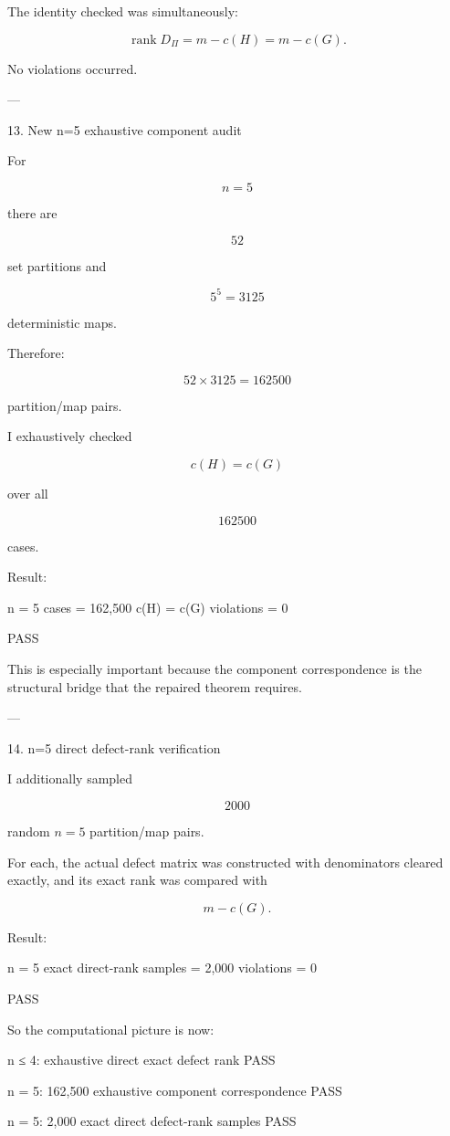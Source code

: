The identity checked was simultaneously:

\[
\operatorname{rank}D_\Pi
=
m-c(H)
=
m-c(G).
\]

No violations occurred.


---

13. New n=5 exhaustive component audit

For

\[
n=5
\]

there are

\[
52
\]

set partitions and

\[
5^5=3125
\]

deterministic maps.

Therefore:

\[
52\times3125
=
162500
\]

partition/map pairs.

I exhaustively checked

\[
c(H)=c(G)
\]

over all

\[
\boxed{162500}
\]

cases.

Result:

n = 5
cases = 162,500
c(H) = c(G)
violations = 0

PASS

This is especially important because the component correspondence is the structural bridge that the repaired theorem requires.


---

14. n=5 direct defect-rank verification

I additionally sampled

\[
2000
\]

random \(n=5\) partition/map pairs.

For each, the actual defect matrix was constructed with denominators cleared exactly, and its exact rank was compared with

\[
m-c(G).
\]

Result:

n = 5
exact direct-rank samples = 2,000
violations = 0

PASS

So the computational picture is now:

n ≤ 4:
    exhaustive
    direct exact defect rank
    PASS

n = 5:
    162,500 exhaustive component correspondence
    PASS

n = 5:
    2,000 exact direct defect-rank samples
    PASS

